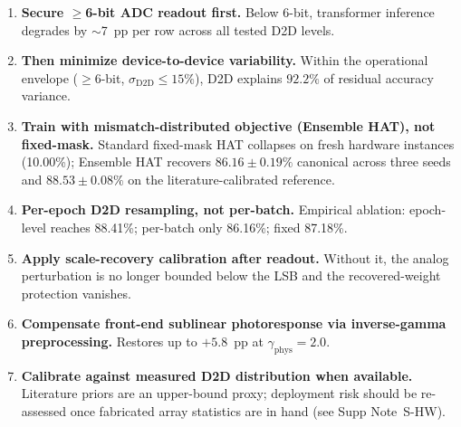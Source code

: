 
\begin{tcolorbox}[colback=blue!5!white,colframe=blue!75!black,title=\textbf{Box~1: Design rules for analog CIM transformer deployment}]
\footnotesize
\begin{enumerate}[leftmargin=1.2em,itemsep=2pt]
    \item \textbf{Secure $\geq$6-bit ADC readout first.}
    Below 6-bit, transformer inference degrades by $\sim$7~pp per row across all tested D2D levels.
    
    \item \textbf{Then minimize device-to-device variability.}
    Within the operational envelope ($\geq$6-bit, $\sigma_{\mathrm{D2D}} \leq 15\%$), D2D explains $92.2\%$ of residual accuracy variance.
    
    \item \textbf{Train with mismatch-distributed objective (Ensemble HAT), not fixed-mask.}
    Standard fixed-mask HAT collapses on fresh hardware instances (10.00\%); Ensemble HAT recovers $86.16\pm0.19\%$ canonical across three seeds and $88.53\pm0.08\%$ on the literature-calibrated reference.
    
    \item \textbf{Per-epoch D2D resampling, not per-batch.}
    Empirical ablation: epoch-level reaches 88.41\%; per-batch only 86.16\%; fixed 87.18\%.
    
    \item \textbf{Apply scale-recovery calibration after readout.}
    Without it, the analog perturbation is no longer bounded below the LSB and the recovered-weight protection vanishes.
    
    \item \textbf{Compensate front-end sublinear photoresponse via inverse-gamma preprocessing.}
    Restores up to $+5.8$~pp at $\gamma_{\mathrm{phys}}=2.0$.
    
    \item \textbf{Calibrate against measured D2D distribution when available.}
    Literature priors are an upper-bound proxy; deployment risk should be re-assessed once fabricated array statistics are in hand (see Supp Note~S-HW).
\end{enumerate}
\end{tcolorbox}
